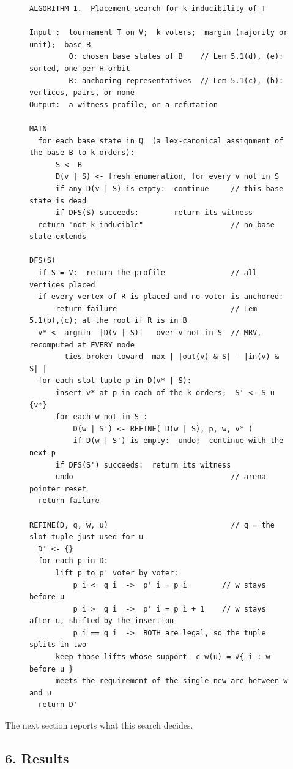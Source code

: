 \documentclass[
]{article}
\newcounter{none} %
\begin{document}
\begin{figure}[!htbp]
\begin{verbatim}
ALGORITHM 1.  Placement search for k-inducibility of T

Input :  tournament T on V;  k voters;  margin (majority or unit);  base B
         Q: chosen base states of B    // Lem 5.1(d), (e): sorted, one per H-orbit
         R: anchoring representatives  // Lem 5.1(c), (b): vertices, pairs, or none
Output:  a witness profile, or a refutation

MAIN
  for each base state in Q  (a lex-canonical assignment of the base B to k orders):
      S <- B
      D(v | S) <- fresh enumeration, for every v not in S
      if any D(v | S) is empty:  continue     // this base state is dead
      if DFS(S) succeeds:        return its witness
  return "not k-inducible"                    // no base state extends

DFS(S)
  if S = V:  return the profile               // all vertices placed
  if every vertex of R is placed and no voter is anchored:
      return failure                          // Lem 5.1(b),(c); at the root if R is in B
  v* <- argmin  |D(v | S)|   over v not in S  // MRV, recomputed at EVERY node
        ties broken toward  max | |out(v) & S| - |in(v) & S| |
  for each slot tuple p in D(v* | S):
      insert v* at p in each of the k orders;  S' <- S u {v*}
      for each w not in S':
          D(w | S') <- REFINE( D(w | S), p, w, v* )
          if D(w | S') is empty:  undo;  continue with the next p
      if DFS(S') succeeds:  return its witness
      undo                                    // arena pointer reset
  return failure

REFINE(D, q, w, u)                            // q = the slot tuple just used for u
  D' <- {}
  for each p in D:
      lift p to p' voter by voter:
          p_i <  q_i  ->  p'_i = p_i        // w stays before u
          p_i >  q_i  ->  p'_i = p_i + 1    // w stays after u, shifted by the insertion
          p_i == q_i  ->  BOTH are legal, so the tuple splits in two
      keep those lifts whose support  c_w(u) = #{ i : w before u }
      meets the requirement of the single new arc between w and u
  return D'
\end{verbatim}
\end{figure}

The next section reports what this search decides.

\subsection{6. Results}\label{results}
\end{document}
